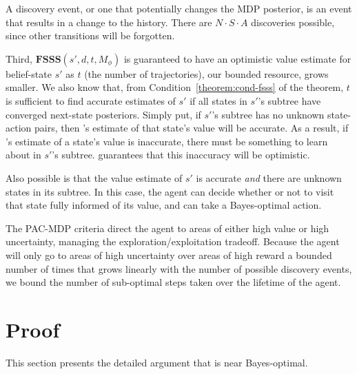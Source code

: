 A discovery event, or one that potentially changes the MDP posterior, is an event that results in a change to the history. There are $N \cdot S \cdot A$ discoveries possible, since other transitions will be forgotten.

Third, $\mathbf{FSSS}(s',d,t,M_\phi)$ is guaranteed to have an optimistic value estimate for belief-state $s'$ as $t$ (the number of trajectories), our bounded resource, grows smaller. We also know that, from Condition~\ref{theorem:cond-fsss} of the theorem, $t$ is sufficient to find accurate estimates of $s'$ if all states in $s'$'s subtree have converged next-state posteriors. Simply put, if $s'$'s subtree has no unknown state-action pairs, then 's estimate of that state's value will be accurate.  As a result, if 's estimate of a state's value is inaccurate, there must be something to learn about in $s'$'s subtree.  guarantees that this inaccuracy will be optimistic.

Also possible is that the value estimate of $s'$ is accurate \emph{and} there are unknown states in its subtree. In this case, the agent can decide whether or not to visit that state fully informed of its value, and can take a Bayes-optimal action.

The PAC-MDP criteria direct the agent to areas of either high value or high uncertainty, managing the exploration/exploitation tradeoff. Because the agent will only go to areas of high uncertainty over areas of high reward a bounded number of times that grows linearly with the number of possible discovery events, we bound the number of sub-optimal steps taken over the lifetime of the agent.

\section{Proof}


This section presents the detailed argument that  is near
Bayes-optimal.

